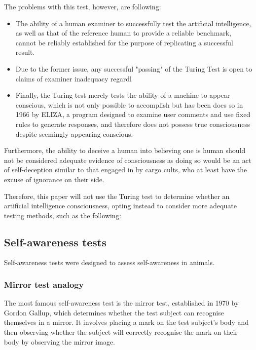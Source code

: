 \documentclass[masterthesis]{fer}
\begin{document}
The problems with this test, however, are following:
\begin{itemize}
\item The ability of a human examiner to successfully test the artificial intelligence, as well as that of the reference human to provide a reliable benchmark, cannot be reliably established for the purpose of replicating a successful result.

\item Due to the former issue, any successful "passing" of the Turing Test is open to claims of examiner inadequacy regardl

\item Finally, the Turing test merely tests the ability of a machine to appear conscious, which is not only possible to accomplish but has been does so in 1966 by ELIZA, a program designed to examine user comments and use fixed rules to generate responses, and therefore does not possess true consciousness despite seemingly appearing conscious.
\end{itemize}


Furthermore, the ability to deceive a human into believing one is human should not be considered adequate evidence of consciousness as doing so would be an act of self-deception similar to that engaged in by cargo cults, who at least have the excuse of ignorance on their side.

Therefore, this paper will not use the Turing test to determine whether an artificial intelligence consciousness, opting instead to consider more adequate testing methods, such as the following:
\subsection{Self-awareness tests}
Self-awareness tests were designed to assess self-awareness in animals.
\subsubsection{Mirror test analogy}
The most famous self-awareness test is the mirror test, established in 1970 by Gordon Gallup, which determines whether the test subject can recognise themselves in a mirror.
It involves placing a mark on the test subject's body and then observing whether the subject will correctly recognise the mark on their body by observing the mirror image.
\end{document}
